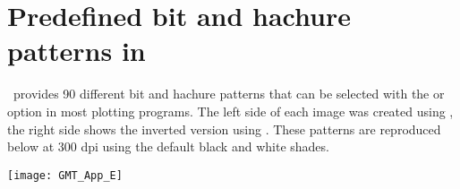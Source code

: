 %
%
\chapter{Predefined bit and hachure patterns in \gmt}
\label{app:E}
\thispagestyle{headings}

\GMT\ provides 90 different bit and hachure patterns that can be
selected with the  or  option in most plotting programs.
The left side of each image was created using , the right side
shows the inverted version using .
These patterns are reproduced below at 300 dpi using the default black and white shades.

\begin{center}
\texttt{[image: GMT\_App\_E]}
\end{center}
